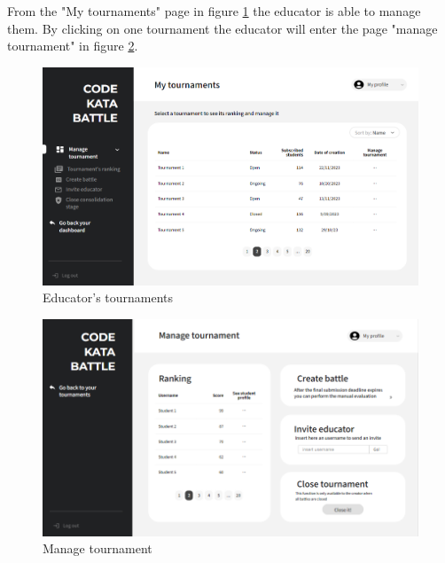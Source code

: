 From the "My tournaments" page in figure \ref{fig:EmyT} the educator is able to manage them. By clicking on one tournament the educator will enter the page "manage tournament" in figure \ref{fig:manageT}.
\begin{figure}[h]
    \centering
    \includegraphics[width=\textwidth]{images/mockups/educators/MyTournaments.png}
    \caption{Educator's tournaments}
    \label{fig:EmyT}
\end{figure}

\begin{figure}[h]
    \centering
    \includegraphics[width=\textwidth]{images/mockups/educators/ManageTournament.png}
    \caption{Manage tournament}
    \label{fig:manageT}
\end{figure}
\clearpage


